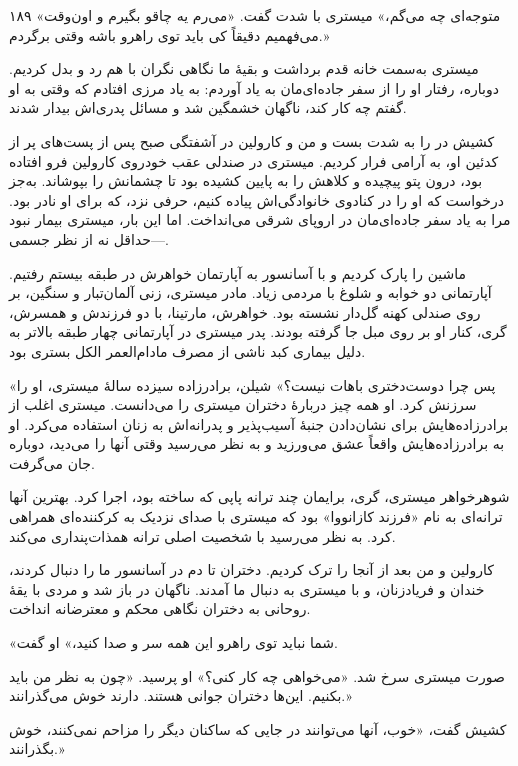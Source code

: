 ۱۸۹  
«متوجه‌ای چه می‌گم،» میستری با شدت گفت. «می‌رم یه چاقو بگیرم و اون‌وقت می‌فهمیم دقیقاً کی باید توی راهرو باشه وقتی برگردم.»

میستری به‌سمت خانه قدم برداشت و بقیهٔ ما نگاهی نگران با هم رد و بدل کردیم. دوباره، رفتار او را از سفر جاده‌ای‌مان به یاد آوردم: به یاد مرزی افتادم که وقتی به او گفتم چه کار کند، ناگهان خشمگین شد و مسائل پدری‌اش بیدار شدند.

کشیش در را به شدت بست و من و کارولین در آشفتگی صبح پس از پست‌های پر از کدئین او، به آرامی فرار کردیم. میستری در صندلی عقب خودروی کارولین فرو افتاده بود، درون پتو پیچیده و کلاهش را به پایین کشیده بود تا چشمانش را بپوشاند. به‌جز درخواست که او را در کنادوی خانوادگی‌اش پیاده کنیم، حرفی نزد، که برای او نادر بود. مرا به یاد سفر جاده‌ای‌مان در اروپای شرقی می‌انداخت. اما این بار، میستری بیمار نبود—حداقل نه از نظر جسمی.

ماشین را پارک کردیم و با آسانسور به آپارتمان خواهرش در طبقه بیستم رفتیم. آپارتمانی دو خوابه و شلوغ با مردمی زیاد. مادر میستری، زنی آلمان‌تبار و سنگین، بر روی صندلی کهنه گل‌دار نشسته بود. خواهرش، مارتینا، با دو فرزندش و همسرش، گری، کنار او بر روی مبل جا گرفته بودند. پدر میستری در آپارتمانی چهار طبقه بالاتر به دلیل بیماری کبد ناشی از مصرف مادام‌العمر الکل بستری بود.

«پس چرا دوست‌دختری باهات نیست؟» شیلن، برادرزاده سیزده سالهٔ میستری، او را سرزنش کرد. او همه چیز دربارهٔ دختران میستری را می‌دانست. میستری اغلب از برادرزاده‌هایش برای نشان‌‌دادن جنبهٔ آسیب‌پذیر و پدرانه‌اش به زنان استفاده می‌کرد. او به برادرزاده‌هایش واقعاً عشق می‌ورزید و به نظر می‌رسید وقتی آنها را می‌دید، دوباره جان می‌گرفت.

شوهرخواهر میستری، گری، برایمان چند ترانه پاپی که ساخته بود، اجرا کرد. بهترین آنها ترانه‌ای به نام «فرزند کازانووا» بود که میستری با صدای نزدیک به کرکننده‌ای همراهی کرد. به نظر می‌رسید با شخصیت اصلی ترانه همذات‌پنداری می‌کند.

کارولین و من بعد از آنجا را ترک کردیم. دختران تا دم در آسانسور ما را دنبال کردند، خندان و فریادزنان، و با میستری به دنبال ما آمدند. ناگهان در باز شد و مردی با یقهٔ روحانی به دختران نگاهی محکم و معترضانه انداخت.

«شما نباید توی راهرو این همه سر و صدا کنید،» او گفت.

صورت میستری سرخ شد. «می‌خواهی چه کار کنی؟» او پرسید. «چون به نظر من باید بکنیم. این‌ها دختران جوانی هستند. دارند خوش می‌گذرانند.»

کشیش گفت، «خوب، آنها می‌توانند در جایی که ساکنان دیگر را مزاحم نمی‌کنند، خوش بگذرانند.»